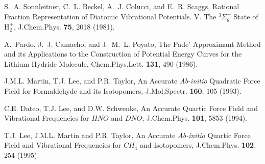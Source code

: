 \begin{thebibliography}{999}

S.~A. Sonnleitner, C.~L. Beckel, A.~J. Colucci, and E.~R. Scaggs,
Rational Fraction Representation of Diatomic 
Vibrational Potentials. V. The $^{3} \Sigma_g^+ $ State of H$_2^+$,
\newblock J.Chem.Phys. {\bf 75}, 2018 (1981).

A.~Pardo, J.~J. Camacho, and J.~M.~L. Poyato,
The Pade' Approximant Method and its Applications to the Construction of
Potential Energy Curves for the Lithium Hydride Molecule,
\newblock Chem.Phys.Lett. {\bf 131}, 490 (1986).


J.M.L. Martin, T.J. Lee, and P.R. Taylor,
An Accurate {\it Ab-initio} Quadratic Force Field for
Formaldehyde and its Isotopomers,
J.Mol.Spectr. {\bf 160}, 105 (1993).

%

C.E. Dateo, T.J. Lee, and D.W. Schwenke,
An Accurate Quartic Force Field and Vibrational Frequencies
for $HNO$ and $DNO$,
J.Chem.Phys. {\bf 101}, 5853 (1994).





T.J. Lee, J.M.L. Martin and P.R. Taylor,
An Accurate {\it Ab-initio} Quartic Force Field and Vibrational
Frequencies for $CH_4$ and Isotopomers,
J.Chem.Phys. {\bf 102}, 254 (1995).


\end{thebibliography}
